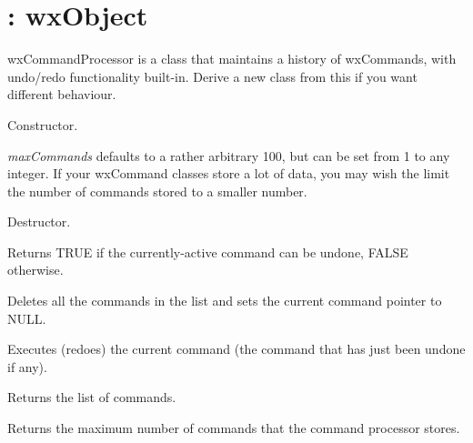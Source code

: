 \section{: wxObject}\label{wxcommandprocessor}


wxCommandProcessor is a class that maintains a history of wxCommands,
with undo/redo functionality built-in. Derive a new class from this
if you want different behaviour.



Constructor.

{\it maxCommands} defaults to a rather arbitrary 100, but can be set from 1 to any integer.
If your wxCommand classes store a lot of data, you may wish the limit the number of
commands stored to a smaller number.



Destructor.



Returns TRUE if the currently-active command can be undone, FALSE otherwise.



Deletes all the commands in the list and sets the current command pointer to NULL.



Executes (redoes) the current command (the command that has just been undone if any).



Returns the list of commands.



Returns the maximum number of commands that the command processor stores.

